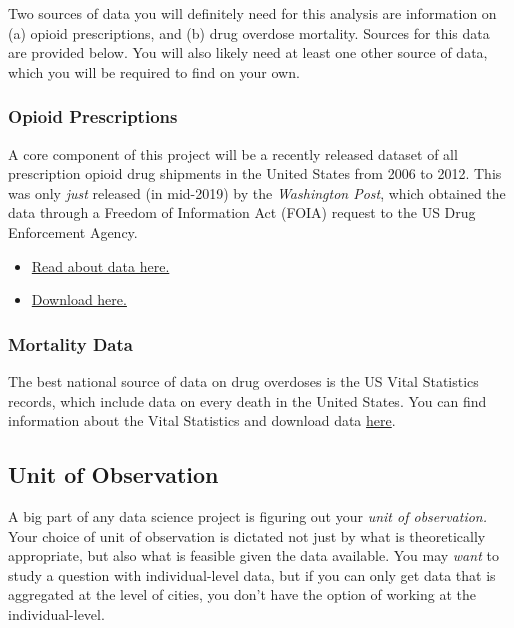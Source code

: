 \documentclass[12pt]{article}
\begin{document}
Two sources of data you will definitely need for this analysis are information on (a) opioid prescriptions, and (b) drug overdose mortality. Sources for this data are provided below. You will also likely need at least one other source of data, which you will be required to find on your own.

\subsubsection*{Opioid Prescriptions}

A core component of this project will be a recently released dataset of all prescription opioid drug shipments in the United States from 2006 to 2012. This was only \emph{just} released (in mid-2019) by the \emph{Washington Post}, which obtained the data through a Freedom of Information Act (FOIA) request to the US Drug Enforcement Agency.

\begin{itemize}
  \item \href{https://www.washingtonpost.com/graphics/2019/investigations/dea-pain-pill-database/}{Read about data here.}
  \item \href{https://www.washingtonpost.com/national/2019/07/18/how-download-use-dea-pain-pills-database/?arc404=true}{Download here.}
\end{itemize}

\subsubsection*{Mortality Data}

The best national source of data on drug overdoses is the US Vital Statistics records, which include data on every death in the United States. You can find information about the Vital Statistics and download data \href{https://www.cdc.gov/nchs/nvss/deaths.htm}{here}.


\subsection*{Unit of Observation}

A big part of any data science project is figuring out your \emph{unit of observation.} Your choice of unit of observation is dictated not just by what is theoretically appropriate, but also what is feasible given the data available. You may \emph{want} to study a question with individual-level data, but if you can only get data that is aggregated at the level of cities, you don't have the option of working at the individual-level.
\end{document}
